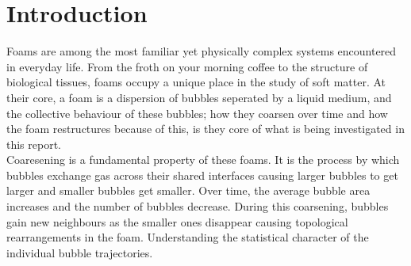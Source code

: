 \section{Introduction} \label{sec:introduction}
Foams are among the most familiar yet physically complex systems encountered in everyday life. From the froth on your morning coffee to the structure of biological tissues, foams occupy a unique place in the study of soft matter. At their core, a foam is a dispersion of bubbles seperated by a liquid medium, and the collective behaviour of these bubbles; how they coarsen over time and how the foam restructures because of this, is they core of what is being investigated in this report.\\

Coaresening is a fundamental property of these foams. It is the process by which bubbles exchange gas across their shared interfaces causing larger bubbles to get larger and smaller bubbles get smaller. Over time, the average bubble area increases and the number of bubbles decrease. During this coarsening, bubbles gain new neighbours as the smaller ones disappear causing topological rearrangements in the foam. Understanding the statistical character of the individual bubble trajectories.